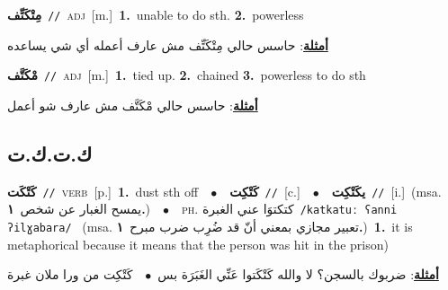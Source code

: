 \documentclass[10pt,a4paper,twoside]{article} %
\begin{document}
\begin{multicols}{2}
{\setlength\topsep{0pt}\textbf{\foreignlanguage{arabic}{مِتْكَتِّف}}\ {\color{gray}\texttt{//}\color{black}}\ \textsc{adj}\ [m.]\ \textbf{1.}~unable to do sth.  \textbf{2.}~powerless\  \begin{flushright}\color{gray}\foreignlanguage{arabic}{\textbf{\underline{\foreignlanguage{arabic}{أمثلة}}}: حاسس حالي مِتْكَتِّف مش عارف أعمله أي شي يساعده}\end{flushright}\color{black}} \vspace{2mm}

{\setlength\topsep{0pt}\textbf{\foreignlanguage{arabic}{مْكَتَّف}}\ {\color{gray}\texttt{//}\color{black}}\ \textsc{adj}\ [m.]\ \textbf{1.}~tied up.  \textbf{2.}~chained  \textbf{3.}~powerless to do sth\  \begin{flushright}\color{gray}\foreignlanguage{arabic}{\textbf{\underline{\foreignlanguage{arabic}{أمثلة}}}: حاسس حالي مْكَتَّف مش عارف شو أعمل}\end{flushright}\color{black}} \vspace{2mm}

\vspace{-3mm}
\subsection*{\color{blue}\foreignlanguage{arabic}{ك.ت.ك.ت}\color{blue}{}} 

{\setlength\topsep{0pt}\textbf{\foreignlanguage{arabic}{كَتْكَت}}\ {\color{gray}\texttt{//}\color{black}}\ \textsc{verb}\ [p.]\ \textbf{1.}~dust sth off\ \ $\bullet$\ \ \setlength\topsep{0pt}\textbf{\foreignlanguage{arabic}{كَتْكِت}}\ {\color{gray}\texttt{//}\color{black}}\ [c.]\ \ $\bullet$\ \ \setlength\topsep{0pt}\textbf{\foreignlanguage{arabic}{يكَتْكِت}}\ {\color{gray}\texttt{//}\color{black}}\ [i.]\ \color{gray}(msa. \foreignlanguage{arabic}{يمسح الغبار عن شخص}~\foreignlanguage{arabic}{\textbf{١.}})\color{black}\ \ $\bullet$\ \ \textsc{ph.} \color{gray} \foreignlanguage{arabic}{كتكتوَا عني الغبرة}\color{black}\ {\color{gray}\texttt{/{\sffamily katkatuː ʕanni ʔilɣabara}/}\color{black}}\ \color{gray} (msa. \foreignlanguage{arabic}{تعبير مجازي بمعني أنّ قد ضُرِب ضرب مبرح}~\foreignlanguage{arabic}{\textbf{١.}})\color{black}\ \textbf{1.}~it is metaphorical because it means that the person was hit in the prison)\  \begin{flushright}\color{gray}\foreignlanguage{arabic}{\textbf{\underline{\foreignlanguage{arabic}{أمثلة}}}: ضربوك بالسجن؟ لا والله كَتْكَتوا عَنِّي الغَبَرَة بس\ $\bullet$\ \  كَتْكِت من ورا ملان غبرة}\end{flushright}\color{black}} \vspace{2mm}


\end{multicols}
\end{document}
